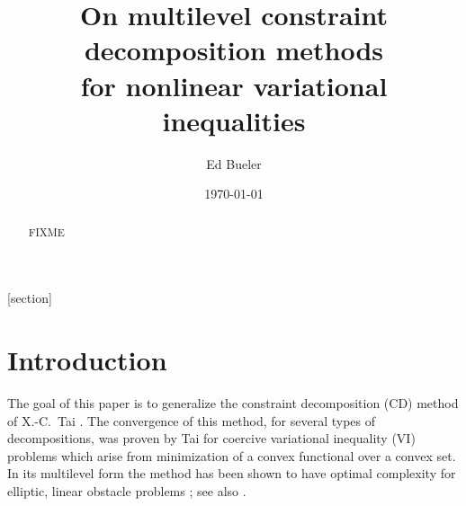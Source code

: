 \documentclass[letterpaper,final,12pt,reqno]{amsart}
\theoremstyle{cstyle}
\theoremstyle{cstyle*}
\theoremstyle{dstyle}
\numberwithin{equation}{section}
\numberwithin{figure}{section}
\numberwithin{table}{section}
\numberwithin{theorem}{section}
\begin{document}
\title[On multilevel constraint decomposition methods]{On multilevel constraint decomposition methods \\ for nonlinear variational inequalities}

\author{Ed Bueler}

\date{\today}

\begin{abstract} FIXME
\end{abstract}

\maketitle


\thispagestyle{empty}

[section]


\section{Introduction} \label{sec:intro}

The goal of this paper is to generalize the constraint decomposition (CD) method of X.-C.~Tai \cite{Tai2003}.  The convergence of this method, for several types of decompositions, was proven by Tai for coercive variational inequality (VI) problems which arise from minimization of a convex functional over a convex set.  In its multilevel form the method has been shown to have optimal complexity for elliptic, linear obstacle problems \cite[Subsection 5.4]{Tai2003}; see also \cite[Theorem 4.6 and Algorithm 4.7]{GraeserKornhuber2009}.
\end{document}
